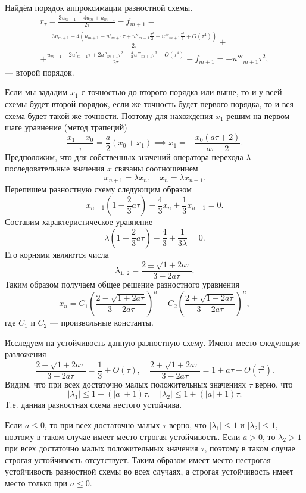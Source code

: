 \documentclass[a4paper]{article}
\begin{document}
\begin{sol}
Найдём порядок аппроксимации разностной схемы.
\begin{multline*}
r_\tau= \frac{3u_{m+1}- 4u_m +u_{m-1}}{2\tau}-
f_{m+1}=\\=
\frac{3 u_{m+1}-4\left(u_{m+1}-u'_{m+1}\tau+u''_{m+1}\frac{\tau^2}{2}+
	u'''_{m+1}\frac{\tau^3}{6}+O\left(\tau^4\right)\right)
}{2\tau}
+\\+
\frac{u_{m+1}- 2u'_{m+1}\tau+2u''_{m+1}\tau^2-
\frac{4}{3}u'''_{m+1}\tau^3+O\left(\tau^4\right)}{2\tau}-f_{m+1}=
-u'''_{m+1}\tau^2
,\end{multline*}  
--- второй порядок.

Если мы зададим $x_1$ с точностью до второго порядка или выше,
то и у всей схемы будет второй порядок, если же точность будет
первого порядка, то и вся схема будет такой же точности. Поэтому
для нахождения $x_1$ решим на первом шаге уравнение
(метод трапеций)
\[
	\frac{x_1-x_0}{\tau}=\frac{a}{2}\left(x_0+x_1  \right) 
	\implies x_1=-\frac{x_0 (a \tau +2)}{a \tau -2}
.\] 
Предположим,
что для собственных значений оператора перехода $\lambda$
последовательные значения $x$ связаны соотношением
\[
x_{n+1}=\lambda x_n,\quad x_n=\lambda x_{n-1}
.\] 
Перепишем разностную схему следующим образом
\[
	x_{n+1}\left( 1-\frac{2}{3}a\tau \right) -\frac{4}{3}
	x_n+\frac{1}{3}x_{n-1}=0
.\] 
Составим характеристическое уравнение
\[
	\lambda\left( 1-\frac{2}{3}a\tau \right) -\frac{4}{3}+
	\frac{1}{3\lambda}=0
.\] 
Его корнями являются числа
\[
\lambda_{1,\,2}= \frac{2\pm\sqrt{1+2a\tau} }{3-2a\tau}
.\] 
Таким образом получаем общее решение разностного уравнения
\[
	x_n= C_1 \left( \frac{2 -\sqrt{1+2a\tau} }{3-2a\tau} \right) ^n+C_2 \left( \frac{2+\sqrt{1+2a\tau} }{3-2a\tau} \right) ^n
,\]
где $C_1$ и $C_2$ --- произвольные константы.

Исследуем на устойчивость данную разностную схему.  Имеют
место следующие разложения
\[
	\frac{2-\sqrt{1+2a\tau} }{3-2a\tau}= \frac{1}{3}+ O(\tau)
	,\quad
	\frac{2+\sqrt{1+2a \tau} }{3-2a\tau}=1+a\tau +O\left( \tau^2 \right) 
.\] 
Видим, что при всех достаточно малых положительных значениях
$\tau$ верно, что 
\[
	|\lambda_1|\le 1+\left(|a|+1\right) \tau,\quad
	|\lambda_2|\le 1+\left( |a|+1 \right) \tau
.\] 
Т.\:е. данная разностная схема нестого устойчива.

Если $a\le 0$, то при всех достаточно малых $\tau$ верно, что
$|\lambda_1|\le 1$ и $|\lambda_2|\le 1$, поэтому в таком
случае имеет место строгая устойчивость. Если $a>0$, то $\lambda_2>1$ при всех достаточно малых положительных значения $\tau$,
поэтому в таком случае строгая устойчивость отсутствует. Таким
образом имеет место нестрогая устойчивость разностной схемы
во всех случаях, а строгая устойчивость имеет место только
при $a\le 0$.
\end{sol}
\end{document}
